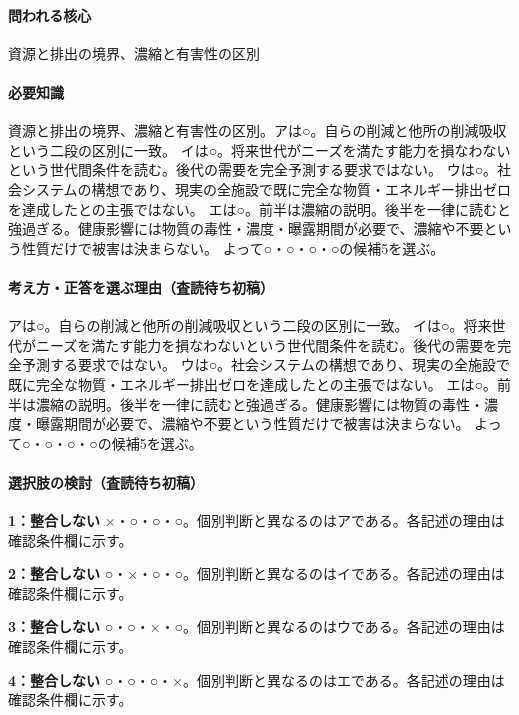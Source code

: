 \paragraph{問われる核心} 資源と排出の境界、濃縮と有害性の区別

\paragraph{必要知識} 資源と排出の境界、濃縮と有害性の区別。アは○。自らの削減と他所の削減吸収という二段の区別に一致。 イは○。将来世代がニーズを満たす能力を損なわないという世代間条件を読む。後代の需要を完全予測する要求ではない。 ウは○。社会システムの構想であり、現実の全施設で既に完全な物質・エネルギー排出ゼロを達成したとの主張ではない。 エは○。前半は濃縮の説明。後半を一律に読むと強過ぎる。健康影響には物質の毒性・濃度・曝露期間が必要で、濃縮や不要という性質だけで被害は決まらない。 よって○・○・○・○の候補5を選ぶ。

\paragraph{考え方・正答を選ぶ理由（査読待ち初稿）} アは○。自らの削減と他所の削減吸収という二段の区別に一致。 イは○。将来世代がニーズを満たす能力を損なわないという世代間条件を読む。後代の需要を完全予測する要求ではない。 ウは○。社会システムの構想であり、現実の全施設で既に完全な物質・エネルギー排出ゼロを達成したとの主張ではない。 エは○。前半は濃縮の説明。後半を一律に読むと強過ぎる。健康影響には物質の毒性・濃度・曝露期間が必要で、濃縮や不要という性質だけで被害は決まらない。 よって○・○・○・○の候補5を選ぶ。

\paragraph{選択肢の検討（査読待ち初稿）}\mbox{}\par

\noindent\textbf{1：整合しない} ×・○・○・○。個別判断と異なるのはアである。各記述の理由は確認条件欄に示す。\par

\noindent\textbf{2：整合しない} ○・×・○・○。個別判断と異なるのはイである。各記述の理由は確認条件欄に示す。\par

\noindent\textbf{3：整合しない} ○・○・×・○。個別判断と異なるのはウである。各記述の理由は確認条件欄に示す。\par

\noindent\textbf{4：整合しない} ○・○・○・×。個別判断と異なるのはエである。各記述の理由は確認条件欄に示す。\par

